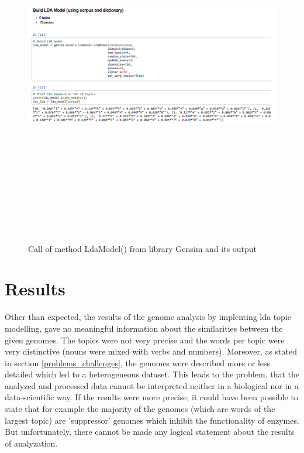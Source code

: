 \begin{figure}[htbp]
	\centering
	\includegraphics[width=1\textwidth, height=600px, keepaspectratio]{Image/lda_gensim_result.png}
	\caption{Call of method LdaModel() from library Gensim and its output}
	\label{lda_gensim_result}
\end{figure}

\section{Results}\label{results}

Other than expected, the results of the genome analysis by implenting \ac{lda} topic modelling, gave no meaningful information about the similarities between the given genomes. The topics were not very precise and the words per topic were very distinctive (nouns were mixed with verbs and numbers). Moreover, as stated in section \ref{problems_challenges}, the genomes were described more or less detailed which led to a heterogeneous dataset. 
This leads to the problem, that the analyzed and processed data cannot be interpreted neither in a biological nor in a data-scientific way. 
If the results were more precise, it could have been possible to state that for example the majority of the genomes (which are words of the largest topic) are 'suppressor' genomes which inhibit the functionality of enzymes. But unfortunately, there cannot be made any logical statement about the results of analyzation.	

